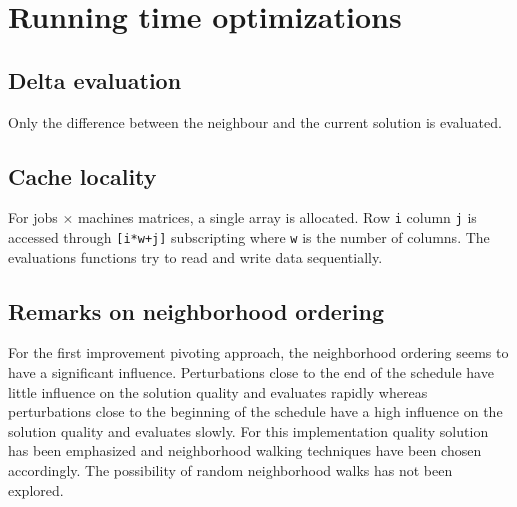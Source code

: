 \newpage\cleardoublepage{}
\section{Running time optimizations}

\subsection{Delta evaluation}

Only the difference between the neighbour and the current solution is evaluated.

\subsection{Cache locality}

For jobs $\times$ machines matrices, a single array is allocated. Row \verb!i! column \verb!j! is accessed through \verb![i*w+j]! subscripting where \verb!w! is the number of columns. The evaluations functions try to read and write data sequentially.

\subsection{Remarks on neighborhood ordering}

For the first improvement pivoting approach, the neighborhood ordering seems to have a significant influence. Perturbations close to the end of the schedule have little influence on the solution quality and evaluates rapidly whereas perturbations close to the beginning of the schedule have a high influence on the solution quality and evaluates slowly. For this implementation quality solution has been emphasized and neighborhood walking techniques have been chosen accordingly. The possibility of random neighborhood walks has not been explored.